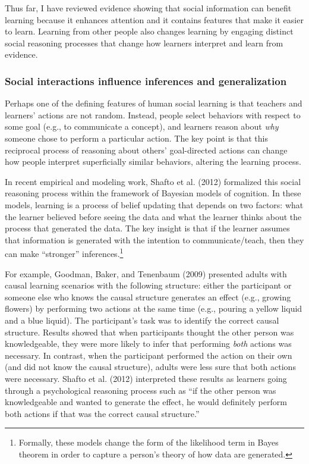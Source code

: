 \documentclass[english,man]{apa6}
\theoremstyle{definition}
\theoremstyle{definition}
\theoremstyle{definition}
\theoremstyle{remark}
\begin{document}
Thus far, I have reviewed evidence showing that social information can
benefit learning because it enhances attention and it contains features
that make it easier to learn. Learning from other people also changes
learning by engaging distinct social reasoning processes that change how
learners interpret and learn from evidence.

\subsubsection{Social interactions influence inferences and
generalization}\label{social-interactions-influence-inferences-and-generalization}

Perhaps one of the defining features of human social learning is that
teachers and learners' actions are not random. Instead, people select
behaviors with respect to some goal (e.g., to communicate a concept),
and learners reason about \emph{why} someone chose to perform a
particular action. The key point is that this reciprocal process of
reasoning about others' goal-directed actions can change how people
interpret superficially similar behaviors, altering the learning
process.

In recent empirical and modeling work, Shafto et al. (2012) formalized
this social reasoning process within the framework of Bayesian models of
cognition. In these models, learning is a process of belief updating
that depends on two factors: what the learner believed before seeing the
data and what the learner thinks about the process that generated the
data. The key insight is that if the learner assumes that information is
generated with the intention to communicate/teach, then they can make
\enquote{stronger} inferences.\footnote{Formally, these models change
  the form of the likelihood term in Bayes theorem in order to capture a
  person's theory of how data are generated.}

For example, Goodman, Baker, and Tenenbaum (2009) presented adults with
causal learning scenarios with the following structure: either the
participant or someone else who knows the causal structure generates an
effect (e.g., growing flowers) by performing two actions at the same
time (e.g., pouring a yellow liquid and a blue liquid). The
participant's task was to identify the correct causal structure. Results
showed that when participants thought the other person was
knowledgeable, they were more likely to infer that performing
\emph{both} actions was necessary. In contrast, when the participant
performed the action on their own (and did not know the causal
structure), adults were less sure that both actions were necessary.
Shafto et al. (2012) interpreted these results as learners going through
a psychological reasoning process such as \enquote{if the other person
was knowledgeable and wanted to generate the effect, he would definitely
perform both actions if that was the correct causal structure.}
\end{document}
